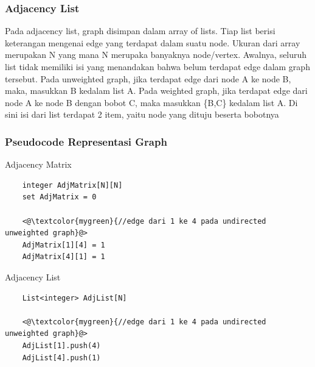 \begin{frame}
\frametitle{Adjacency List}

Pada adjacency list, graph disimpan dalam array of lists. Tiap list berisi keterangan mengenai edge yang terdapat dalam suatu node. Ukuran dari array merupakan N yang mana N merupaka banyaknya node/vertex. \newline\newline
Awalnya, seluruh list tidak memiliki isi yang menandakan bahwa belum terdapat edge dalam graph tersebut. Pada unweighted graph, jika terdapat edge dari node A ke node B, maka, masukkan B kedalam list A. Pada weighted graph, jika terdapat edge dari node A ke node B dengan bobot C, maka masukkan \{B,C\} kedalam list A. Di sini isi dari list terdapat 2 item, yaitu node yang dituju beserta bobotnya
\end{frame}


\begin{frame}[fragile]
\frametitle{Pseudocode Representasi Graph}

Adjacency Matrix
\begin{lstlisting}
	integer AdjMatrix[N][N]
	set AdjMatrix = 0
	
	<@\textcolor{mygreen}{//edge dari 1 ke 4 pada undirected unweighted graph}@>
	AdjMatrix[1][4] = 1
	AdjMatrix[4][1] = 1
\end{lstlisting}
Adjacency List
\begin{lstlisting}
	List<integer> AdjList[N]
	
	<@\textcolor{mygreen}{//edge dari 1 ke 4 pada undirected unweighted graph}@>
	AdjList[1].push(4)
	AdjList[4].push(1)
	
\end{lstlisting}
\end{frame}

\begin{frame}
\end{frame}

